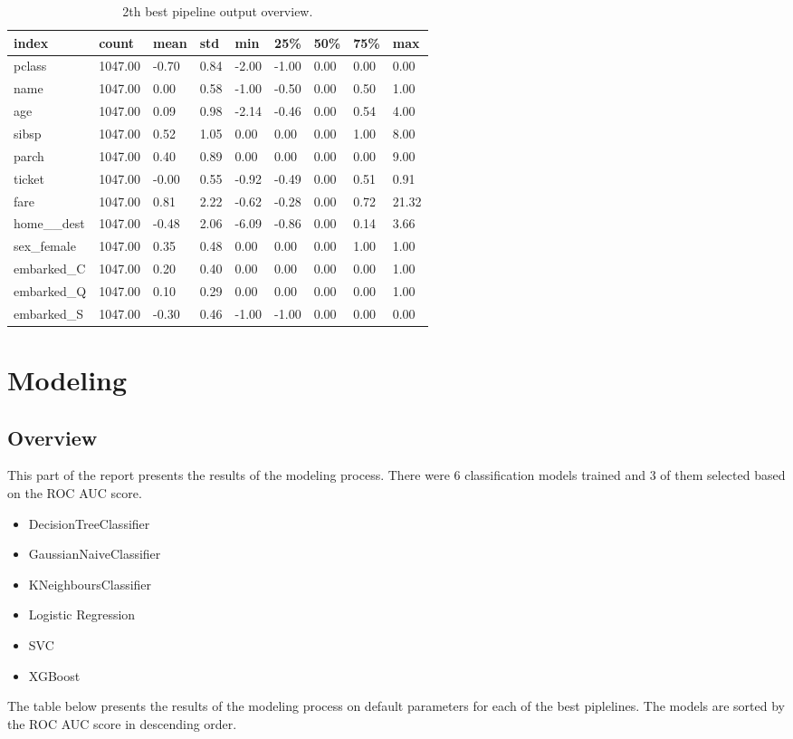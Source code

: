 \documentclass{article}%
\begin{document}
%


\begin{table}[H]%
\begin{center}%
\begin{tabular}{l l l l l l l l l}%
\hline%
\textbf{index}&\textbf{count}&\textbf{mean}&\textbf{std}&\textbf{min}&\textbf{25\%}&\textbf{50\%}&\textbf{75\%}&\textbf{max}\\%
\hline%
pclass&1047.00&{-}0.70&0.84&{-}2.00&{-}1.00&0.00&0.00&0.00\\%
name&1047.00&0.00&0.58&{-}1.00&{-}0.50&0.00&0.50&1.00\\%
age&1047.00&0.09&0.98&{-}2.14&{-}0.46&0.00&0.54&4.00\\%
sibsp&1047.00&0.52&1.05&0.00&0.00&0.00&1.00&8.00\\%
parch&1047.00&0.40&0.89&0.00&0.00&0.00&0.00&9.00\\%
ticket&1047.00&{-}0.00&0.55&{-}0.92&{-}0.49&0.00&0.51&0.91\\%
fare&1047.00&0.81&2.22&{-}0.62&{-}0.28&0.00&0.72&21.32\\%
home\_\_dest&1047.00&{-}0.48&2.06&{-}6.09&{-}0.86&0.00&0.14&3.66\\%
sex\_female&1047.00&0.35&0.48&0.00&0.00&0.00&1.00&1.00\\%
embarked\_C&1047.00&0.20&0.40&0.00&0.00&0.00&0.00&1.00\\%
embarked\_Q&1047.00&0.10&0.29&0.00&0.00&0.00&0.00&1.00\\%
embarked\_S&1047.00&{-}0.30&0.46&{-}1.00&{-}1.00&0.00&0.00&0.00\\%
\hline%
\end{tabular}%
\end{center}%
\caption{2th best pipeline output overview.}%
\end{table}

%
\section{Modeling}%
\label{sec:Modeling}%

%
\subsection{Overview}%
\label{subsec:Overview}%

%
This part of the report presents the results of the modeling process. There were 6 classification models trained and 3 of them selected based on the ROC AUC score.%
\newline%
%
\newline%
\begin{itemize}%
\item%
DecisionTreeClassifier%
\item%
GaussianNaiveClassifier%
\item%
KNeighboursClassifier%
\item%
Logistic Regression%
\item%
SVC%
\item%
XGBoost%
\end{itemize}%
The table below presents the results of the modeling process on default parameters for each of the best piplelines. The models are sorted by the ROC AUC score in descending order.%
\end{document}
